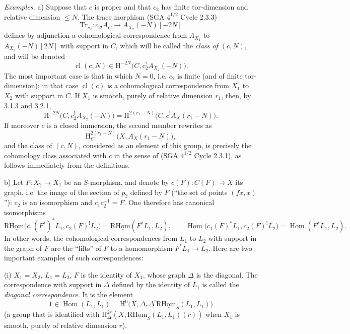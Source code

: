 \documentclass[11pt]{article}
\renewcommand{\H}{\mathrm{H}}
\DeclareMathOperator{\Hom}{Hom}
\providecommand{\Hom}{\operatorname{Hom}}
\providecommand{\Hom}{\operatorname{Hom}}
\begin{document}
\emph{Examples.} a) Suppose that $c$ is proper and that $c_2$ has finite tor-dimension and relative dimension $\leq N$. The trace morphism (SGA $4^{1/2}$ Cycle 2.3.3)
\[
\mathrm{Tr}_{c_2}:c_{2!}A_C\longrightarrow A_{X_2}(-N)[-2N]
\]
defines by adjunction a cohomological correspondence from $A_{X_1}$ to $A_{X_2}(-N)[2N]$ with support in $C$, which will be called the \emph{class of $(c,N)$}, and will be denoted
\begin{equation}
\operatorname{cl}(c,N)\in \H^{-2N}\bigl(C,c_2^!A_{X_2}(-N)\bigr).
\tag{3.2.4}
\end{equation}
The most important case is that in which $N=0$, i.e. $c_2$ is finite (and of finite tor-dimension); in that case $\operatorname{cl}(c)$ is a cohomological correspondence from $X_1$ to $X_2$ with support in $C$. If $X_1$ is smooth, purely of relative dimension $r_1$, then, by 3.1.3 and 3.2.1,
\begin{equation}
\H^{-2N}\bigl(C,c_2^!A_{X_2}(-N)\bigr)
=
\H^{2(r_1-N)}\bigl(C,c^!A_X(r_1-N)\bigr).
\tag{3.2.5}
\end{equation}
If moreover $c$ is a closed immersion, the second member rewrites as
\[
\H^{2(r_1-N)}_C\bigl(X,A_X(r_1-N)\bigr),
\]
and the class of $(c,N)$, considered as an element of this group, is precisely the cohomology class associated with $c$ in the sense of (SGA $4^{1/2}$ Cycle 2.3.1), as follows immediately from the definitions.

b) Let $F:X_2\to X_1$ be an $S$-morphism, and denote by $c(F):C(F)\to X$ its graph, i.e. the image of the section of $p_2$ defined by $F$ (``the set of points $(fx,x)$''): $c_2$ is an isomorphism and $c_1c_2^{-1}=F$. One therefore has canonical isomorphisms
\begin{equation}
\mathrm{R}\underline{\mathrm{Hom}}\bigl(c_1(F^*)^*L_1,c_2(F)^!L_2\bigr)=\mathrm{R}\underline{\mathrm{Hom}}(F^*L_1,L_2),
\qquad
\Hom\bigl(c_1(F)^*L_1,c_2(F)^!L_2\bigr)=\Hom(F^*L_1,L_2).
\tag{3.2.6}
\end{equation}
In other words, the cohomological correspondences from $L_1$ to $L_2$ with support in the graph of $F$ are the ``lifts'' of $F$ to a homomorphism $F^*L_1\to L_2$. Here are two important examples of such correspondences:

(i) $X_1=X_2$, $L_1=L_2$, $F$ is the identity of $X_1$, whose graph $\Delta$ is the diagonal. The correspondence with support in $\Delta$ defined by the identity of $L_1$ is called the \emph{diagonal correspondence}. It is the element
\[
1\in \Hom(L_1,L_1)=\H^0\bigl(X,\Delta_*\Delta^!\mathrm{R}\underline{\mathrm{Hom}}_S(L_1,L_1)\bigr)
\]
(a group that is identified with $\H^{2r}_\Delta(X,\mathrm{R}\underline{\mathrm{Hom}}_S(L_1,L_1)(r))$ when $X_1$ is smooth, purely of relative dimension $r$).
\end{document}
